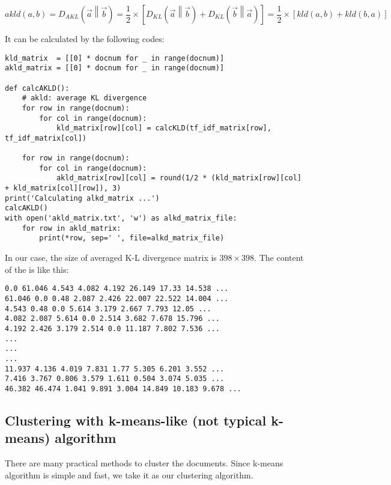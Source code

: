 \documentclass[a4paper, 12pt]{article}
\begin{document}
$$akld(a,b) = D_{AKL}\left(\overrightarrow{a} \middle\| \overrightarrow{b}\right) = \frac{1}{2} \times \left[D_{KL}\left(\overrightarrow{a} \middle\| \overrightarrow{b}\right) + D_{KL}\left(\overrightarrow{b} \middle\| \overrightarrow{a}\right)\right] = \frac{1}{2} \times \left[kld(a,b) + kld(b,a)\right] $$

It can be calculated by the following codes:

\newpage
\begin{lstlisting}[style=myPython,caption={Calculate averaged K-L divergence matrix}]
kld_matrix  = [[0] * docnum for _ in range(docnum)]
akld_matrix = [[0] * docnum for _ in range(docnum)]

def calcAKLD():
    # akld: average KL divergence
    for row in range(docnum):
        for col in range(docnum):
            kld_matrix[row][col] = calcKLD(tf_idf_matrix[row], tf_idf_matrix[col])

    for row in range(docnum):
        for col in range(docnum):
            akld_matrix[row][col] = round(1/2 * (kld_matrix[row][col] + kld_matrix[col][row]), 3)
print('Calculating alkd_matrix ...')
calcAKLD()
with open('akld_matrix.txt', 'w') as alkd_matrix_file:
    for row in akld_matrix:
        print(*row, sep=' ', file=alkd_matrix_file)
\end{lstlisting}

In our case, the size of averaged K-L divergence matrix is $398 \times 398$. The content of the  is like this:

\begin{lstlisting}[style=plainText,caption={akld\_matrix.txt}]
0.0 61.046 4.543 4.082 4.192 26.149 17.33 14.538 ...
61.046 0.0 0.48 2.087 2.426 22.007 22.522 14.004 ...
4.543 0.48 0.0 5.614 3.179 2.667 7.793 12.05 ...
4.082 2.087 5.614 0.0 2.514 3.682 7.678 15.796 ...
4.192 2.426 3.179 2.514 0.0 11.187 7.802 7.536 ...
...
...
...
11.937 4.136 4.019 7.831 1.77 5.305 6.201 3.552 ...
7.416 3.767 0.806 3.579 1.611 0.504 3.074 5.035 ...
46.382 46.474 1.041 9.891 3.004 14.849 10.183 9.678 ...
\end{lstlisting}

\subsection{Clustering with k-means-like (not typical k-means) algorithm}
There are many practical methods to cluster the documents. Since k-means algorithm is simple and fast, we take it as our clustering algorithm. %
\end{document}
